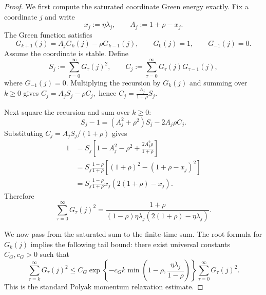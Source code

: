\begin{proof}
We first compute the saturated coordinate Green energy exactly. Fix a coordinate $j$ and write
\[
    x_j:=\eta\lambda_j,
    \qquad
    A_j:=1+\rho-x_j.
\]
The Green function satisfies
\[
    G_{k+1}(j)=A_jG_k(j)-\rho G_{k-1}(j),
    \qquad
    G_0(j)=1,
    \qquad
    G_{-1}(j)=0.
\]
Assume the coordinate is stable. Define
\[
    S_j:=\sum_{\tau=0}^\infty G_\tau(j)^2,
    \qquad
    C_j:=\sum_{\tau=0}^\infty G_\tau(j)G_{\tau-1}(j),
\]
where $G_{-1}(j)=0$. Multiplying the recursion by $G_k(j)$ and summing over $k\ge0$ gives
   $C_j=A_jS_j-\rho C_j,$ hence $C_j=\frac{A_j}{1+\rho}S_j.$

Next square the recursion and sum over $k\ge0$:
\[
    S_j-1
    =
    \left(A_j^2+\rho^2\right)S_j-2A_j\rho C_j.
\]
Substituting $C_j=A_jS_j/(1+\rho)$ gives
\begin{align*}
    1
    &=
    S_j\left[1-A_j^2-\rho^2+\frac{2A_j^2\rho}{1+\rho}\right] \\
    &=
    S_j\frac{1-\rho}{1+\rho}
    \left[(1+\rho)^2-(1+\rho-x_j)^2\right] \\
    &=
    S_j\frac{1-\rho}{1+\rho}
    x_j\left(2(1+\rho)-x_j\right).
\end{align*}
Therefore
\begin{equation}
\label{eq:pol_green_energy_exact}
    \sum_{\tau=0}^\infty G_\tau(j)^2
    =
    \frac{1+\rho}{(1-\rho)\eta\lambda_j\left(2(1+\rho)-\eta\lambda_j\right)}.
\end{equation}

We now pass from the saturated sum to the finite-time sum. The root formula for $G_k(j)$ implies the following tail bound: there exist universal constants $C_G,c_G>0$ such that
\begin{equation}
\label{eq:pol_green_tail_bound}
    \sum_{\tau=k}^{\infty}G_\tau(j)^2
    \le
    C_G\exp\left\{-c_G k\min\left(1-\rho,\frac{\eta\lambda_j}{1-\rho}\right)\right\}
    \sum_{\tau=0}^{\infty}G_\tau(j)^2.
\end{equation}
This is the standard Polyak momentum relaxation estimate.


\end{proof}
